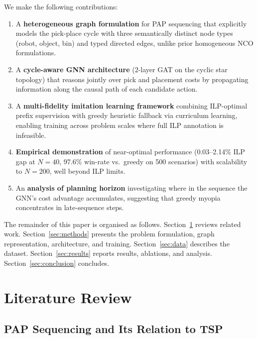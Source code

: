 \documentclass[conference]{IEEEtran}
\begin{document}
We make the following contributions:
\begin{enumerate}
    \item A \textbf{heterogeneous graph formulation} for PAP sequencing that explicitly models the pick-place cycle with three semantically distinct node types (robot, object, bin) and typed directed edges, unlike prior homogeneous NCO formulations.
    \item A \textbf{cycle-aware GNN architecture} (2-layer GAT on the cyclic star topology) that reasons jointly over pick and placement costs by propagating information along the causal path of each candidate action.
    \item A \textbf{multi-fidelity imitation learning framework} combining ILP-optimal prefix supervision with greedy heuristic fallback via curriculum learning, enabling training across problem scales where full ILP annotation is infeasible.
    \item \textbf{Empirical demonstration} of near-optimal performance (0.03--2.14\% ILP gap at $N{=}40$, 97.6\% win-rate vs.\ greedy on 500 scenarios) with scalability to $N{=}200$, well beyond ILP limits.
    \item An \textbf{analysis of planning horizon} investigating where in the sequence the GNN's cost advantage accumulates, suggesting that greedy myopia concentrates in late-sequence steps.
\end{enumerate}

The remainder of this paper is organised as follows. Section~\ref{sec:lit} reviews related work. Section~\ref{sec:methods} presents the problem formulation, graph representation, architecture, and training. Section~\ref{sec:data} describes the dataset. Section~\ref{sec:results} reports results, ablations, and analysis. Section~\ref{sec:conclusion} concludes.

\section{Literature Review}\label{sec:lit}


\subsection{PAP Sequencing and Its Relation to TSP}
\end{document}
